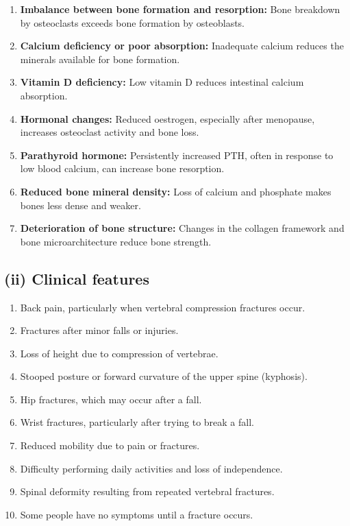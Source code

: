 \documentclass[11pt]{article}
\begin{document}
\begin{enumerate}
    \item \textbf{Imbalance between bone formation and resorption:} Bone breakdown by osteoclasts exceeds bone formation by osteoblasts.
    \item \textbf{Calcium deficiency or poor absorption:} Inadequate calcium reduces the minerals available for bone formation.
    \item \textbf{Vitamin D deficiency:} Low vitamin D reduces intestinal calcium absorption.
    \item \textbf{Hormonal changes:} Reduced oestrogen, especially after menopause, increases osteoclast activity and bone loss.
    \item \textbf{Parathyroid hormone:} Persistently increased PTH, often in response to low blood calcium, can increase bone resorption.
    \item \textbf{Reduced bone mineral density:} Loss of calcium and phosphate makes bones less dense and weaker.
    \item \textbf{Deterioration of bone structure:} Changes in the collagen framework and bone microarchitecture reduce bone strength.
\end{enumerate}

\subsection*{(ii) Clinical features}

\begin{enumerate}
    \item Back pain, particularly when vertebral compression fractures occur.
    \item Fractures after minor falls or injuries.
    \item Loss of height due to compression of vertebrae.
    \item Stooped posture or forward curvature of the upper spine (kyphosis).
    \item Hip fractures, which may occur after a fall.
    \item Wrist fractures, particularly after trying to break a fall.
    \item Reduced mobility due to pain or fractures.
    \item Difficulty performing daily activities and loss of independence.
    \item Spinal deformity resulting from repeated vertebral fractures.
    \item Some people have no symptoms until a fracture occurs.
\end{enumerate}
\end{document}

